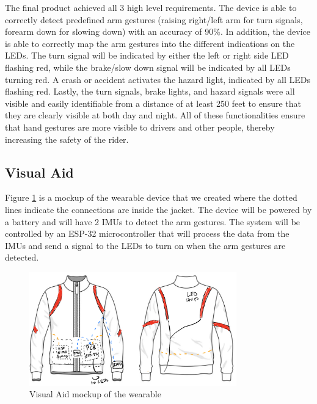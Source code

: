 The final product achieved all 3 high level requirements. The device is able to correctly detect predefined arm gestures (raising right/left arm for turn signals, forearm down for slowing down) with an accuracy of 90\%. In addition, the device is able to correctly map the arm gestures into the different indications on the LEDs. The turn signal will be indicated by either the left or right side LED flashing red, while the brake/slow down signal will be indicated by all LEDs turning red. A crash or accident activates the hazard light, indicated by all LEDs flashing red. Lastly, the turn signals, brake lights, and hazard signals were all visible and easily identifiable from a distance of at least 250 feet to ensure that they are clearly visible at both day and night. All of these functionalities ensure that hand gestures are more visible to drivers and other people, thereby increasing the safety of the rider.
\newpage

\subsection{Visual Aid}
Figure \ref{fig:vis_aid} is a mockup of the wearable device that we created where the dotted lines indicate the connections are inside the jacket. The device will be powered by a battery and will have 2 IMUs to detect the arm gestures. The system will be controlled by an ESP-32 microcontroller that will process the data from the IMUs and send a signal to the LEDs to turn on when the arm gestures are detected.
\begin{figure}[ht]
    \centering
    \includegraphics[width=0.8\textwidth]{images/visual_aid_new.jpg}
    \caption{Visual Aid mockup of the wearable \cite{VectorStock2024}}
    \label{fig:vis_aid}
\end{figure}

